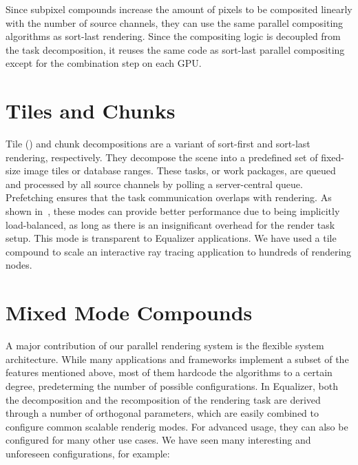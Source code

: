 Since subpixel compounds increase the amount of pixels to be composited
linearly with the number of source channels, they can use the same parallel
compositing algorithms as sort-last rendering. Since the compositing logic is
decoupled from the task decomposition, it reuses the same code as sort-last
parallel compositing except for the combination step on each GPU.

\section{Tiles and Chunks\label{sTile}}

Tile () and chunk decompositions are a variant of sort-first and
sort-last rendering, respectively. They decompose the scene into a predefined
set of fixed-size image tiles or database ranges. These tasks, or work packages,
are queued and processed by all source channels by polling a server-central
queue. Prefetching ensures that the task communication overlaps with rendering.
As shown in~\cite{SPEP:16}, these modes can provide better performance due to
being implicitly load-balanced, as long as there is an insignificant overhead
for the render task setup. This mode is transparent to \textsf{Equalizer}
applications. We have used a tile compound to scale an interactive ray tracing
application to hundreds of rendering nodes.

\section{Mixed Mode Compounds}

A major contribution of our parallel rendering system is the flexible system
architecture. While many applications and frameworks implement a subset of the
features mentioned above, most of them hardcode the algorithms to a certain
degree, predeterming the number of possible configurations. In Equalizer, both
the decomposition and the recomposition of the rendering task are derived
through a number of orthogonal parameters, which are easily combined to
configure common scalable renderig modes. For advanced usage, they can also be
configured for many other use cases. We have seen many interesting and
unforeseen configurations, for example:

